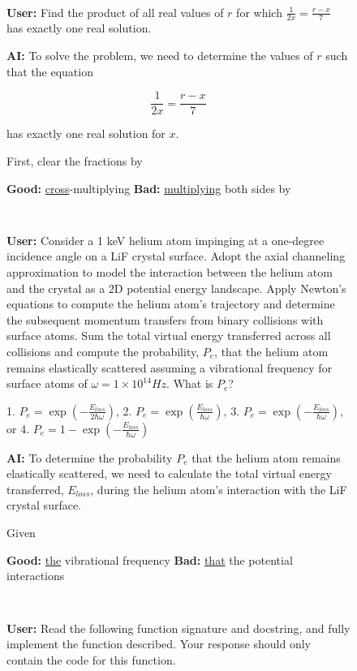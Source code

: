 \begin{figure}
\begin{AIbox}{}
\tt \footnotesize
\begin{minipage}{0.99\textwidth}
\textbf{User:} Find the product of all real values of $r$ for which $\frac{1}{2x}=\frac{r-x}{7}$ has exactly one real solution.

\textbf{AI:} To solve the problem, we need to determine the values of \( r \) such that the equation 

\[
\frac{1}{2x} = \frac{r-x}{7}
\]

has exactly one real solution for \( x \).

First, clear the fractions by

\textbf{Good:} \underline{cross}-multiplying \hspace{2em} \textbf{Bad:} \underline{multiplying} both sides by
\end{minipage}
\end{AIbox}

\begin{AIbox}{}
\tt \footnotesize
\begin{minipage}{0.99\textwidth}
\textbf{User:} Consider a 1 keV helium atom impinging at a one-degree incidence angle on a LiF crystal surface. Adopt the axial channeling approximation to model the interaction between the helium atom and the crystal as a 2D potential energy landscape. Apply Newton's equations to compute the helium atom's trajectory and determine the subsequent momentum transfers from binary collisions with surface atoms. Sum the total virtual energy transferred across all collisions and compute the probability, $P_e$, that the helium atom remains elastically scattered assuming a vibrational frequency for surface atoms of $\omega = 1 \times 10^{14} Hz$. What is $P_e$?

1. $P_e = \exp(-\frac{E_{loss}}{2\hbar \omega})$, 2. $P_e = \exp(\frac{E_{loss}}{\hbar \omega})$, 3. $P_e = \exp(-\frac{E_{loss}}{\hbar \omega})$, or 4. $P_e = 1 - \exp(-\frac{E_{loss}}{\hbar \omega})$

\textbf{AI:} To determine the probability \( P_e \) that the helium atom remains elastically scattered, we need to calculate the total virtual energy transferred, \( E_{loss} \), during the helium atom's interaction with the LiF crystal surface.

Given

\textbf{Good:} \underline{the} vibrational frequency \hspace{2em} \textbf{Bad:} \underline{that} the potential interactions
\end{minipage}
\end{AIbox}
\begin{AIbox}{}
\tt \footnotesize
\begin{minipage}{0.99\textwidth}
\textbf{User:} Read the following function signature and docstring, and fully implement the function described. Your response should only contain the code for this function.


\end{minipage}
\end{AIbox}
\end{figure}
